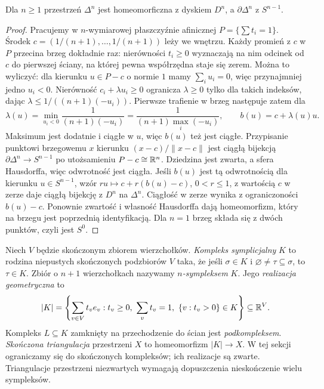 \begin{stwierdzenie}
\label{prop:brzeg-sympleksu}
Dla $n\geq1$ przestrzeń $\Delta^n$
jest homeomorficzna z dyskiem $D^n$,
a $\partial\Delta^n$ z $S^{n-1}$.
\end{stwierdzenie}
\begin{proof}
Pracujemy w $n$-wymiarowej płaszczyźnie
afinicznej $P=\{\sum t_i=1\}$.
Środek $c=(1/(n+1),\ldots,1/(n+1))$
leży we wnętrzu. Każdy promień z $c$
w $P$ przecina brzeg dokładnie raz:
nierówności $t_i\geq0$ wyznaczają
na nim odcinek od $c$ do pierwszej
ściany, na której pewna współrzędna
staje się zerem.
Można to wyliczyć: dla kierunku $u\in P-c$ o normie $1$
mamy $\sum_i u_i=0$, więc przynajmniej jedno $u_i<0$.
Nierówność $c_i+\lambda u_i\geq0$ ogranicza $\lambda\geq0$
tylko dla takich indeksów, dając
$\lambda\leq1/((n+1)(-u_i))$.
Pierwsze trafienie w brzeg następuje zatem dla
\[
 \lambda(u)=\min_{u_i<0}\frac{1}{(n+1)(-u_i)}
           =\frac{1}{(n+1)\max_i(-u_i)},\qquad
 b(u)=c+\lambda(u)u.
\]
Maksimum jest dodatnie i ciągłe w $u$, więc $b(u)$ też jest ciągłe.
Przypisanie punktowi brzegowemu
$x$ kierunku $(x-c)/\|x-c\|$
jest ciągłą bijekcją
$\partial\Delta^n\to S^{n-1}$
po utożsamieniu $P-c\cong\mathbb{R}^n$.
Dziedzina jest zwarta, a sfera
Hausdorffa, więc odwrotność jest
ciągła. Jeśli $b(u)$ jest tą odwrotnością dla kierunku
$u\in S^{n-1}$, wzór $ru\mapsto c+r(b(u)-c)$, $0<r\leq1$,
z wartością $c$ w zerze daje ciągłą bijekcję z $D^n$ na $\Delta^n$.
Ciągłość w zerze wynika z ograniczoności $b(u)-c$.
Ponownie zwartość i własność Hausdorffa dają homeomorfizm,
który na brzegu jest poprzednią identyfikacją. Dla $n=1$ brzeg
składa się z dwóch punktów,
czyli jest $S^0$.
\end{proof}

\begin{definicja}
\label{def:kompleks-symplicjalny}
Niech $V$ będzie skończonym zbiorem
wierzchołków. \emph{Kompleks symplicjalny}
$K$ to rodzina niepustych skończonych
podzbiorów $V$ taka, że jeśli
$\sigma\in K$ i $\varnothing\ne\tau\subseteq\sigma$,
to $\tau\in K$. Zbiór o $n+1$
wierzchołkach nazywamy
\emph{$n$-sympleksem} $K$.
Jego \emph{realizacja geometryczna} to
\[
 |K|=\left\{\sum_{v\in V}t_v e_v:
 t_v\geq0,\ \sum_v t_v=1,\
 \{v:t_v>0\}\in K\right\}\subseteq\mathbb{R}^{V}.
\]
Kompleks $L\subseteq K$ zamknięty
na przechodzenie do ścian jest
\emph{podkompleksem}.
\emph{Skończona triangulacja} przestrzeni $X$
to homeomorfizm $|K|\to X$. W tej sekcji ograniczamy się do
skończonych kompleksów; ich realizacje są zwarte. Triangulacje
przestrzeni niezwartych wymagają dopuszczenia nieskończenie wielu sympleksów.
\end{definicja}

